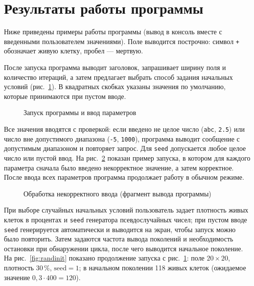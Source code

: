 \newpage
\section{Результаты работы программы}
\label{sec:results}

Ниже приведены примеры работы программы (вывод в консоль вместе с введенными пользователем значениями). Поле выводится построчно: символ \texttt{+} обозначает живую клетку, пробел --- мертвую.

После запуска программа выводит заголовок, запрашивает ширину поля и количество итераций, а затем предлагает выбрать способ задания начальных условий (рис.~\ref{fig:start}). В квадратных скобках указаны значения по умолчанию, которые принимаются при пустом вводе.

\begin{figure}[H]
	\centering
	\caption{Запуск программы и ввод параметров}
	\label{fig:start}
\end{figure}

Все значения вводятся с проверкой: если введено не целое число (\texttt{abc}, \texttt{2.5}) или число вне допустимого диапазона (\texttt{-5}, \texttt{1000}), программа выводит сообщение с допустимым диапазоном и повторяет запрос. Для \texttt{seed} допускается любое целое число или пустой ввод. На рис.~\ref{fig:error} показан пример запуска, в котором для каждого параметра сначала было введено некорректное значение, а затем корректное. После ввода всех параметров программа продолжает работу в обычном режиме.

\begin{figure}[H]
	\centering
	\caption{Обработка некорректного ввода (фрагмент вывода программы)}
	\label{fig:error}
\end{figure}

При выборе случайных начальных условий пользователь задает плотность живых клеток в процентах и \texttt{seed} генератора псевдослучайных чисел; при пустом вводе \texttt{seed} генерируется автоматически и выводится на экран, чтобы запуск можно было повторить. Затем задаются частота вывода поколений и необходимость остановки при обнаружении цикла, после чего выводится начальное поколение. На рис.~\ref{fig:randinit} показано продолжение запуска с рис.~\ref{fig:start}: поле $20 \times 20$, плотность 30\,\%, $\text{seed} = 1$; в начальном поколении 118 живых клеток (ожидаемое значение $0{,}3 \cdot 400 = 120$).

